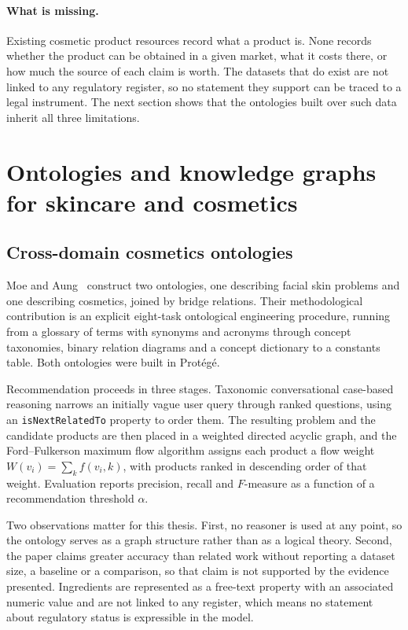 
\paragraph{What is missing.} Existing cosmetic product resources record what a
product is. None records whether the product can be obtained in a given market,
what it costs there, or how much the source of each claim is worth. The datasets
that do exist are not linked to any regulatory register, so no statement they
support can be traced to a legal instrument. The next section shows that the
ontologies built over such data inherit all three limitations.

\section{Ontologies and knowledge graphs for skincare and cosmetics}
\label{sec:rw-ontologies}

\subsection{Cross-domain cosmetics ontologies}
\label{ssec:rw-moe}

Moe and Aung~\cite{moe2014} construct two ontologies, one describing facial
skin problems and one describing cosmetics, joined by bridge relations. Their
methodological contribution is an explicit eight-task ontological engineering
procedure, running from a glossary of terms with synonyms and acronyms through
concept taxonomies, binary relation diagrams and a concept dictionary to a
constants table. Both ontologies were built in Prot\'eg\'e.

Recommendation proceeds in three stages. Taxonomic conversational case-based
reasoning narrows an initially vague user query through ranked questions, using
an \texttt{isNextRelatedTo} property to order them. The resulting problem and
the candidate products are then placed in a weighted directed acyclic graph, and
the Ford--Fulkerson maximum flow algorithm assigns each product a flow weight
$W(v_i)=\sum_k f(v_i,k)$, with products ranked in descending order of that
weight. Evaluation reports precision, recall and $F$-measure as a function of a
recommendation threshold $\alpha$.

Two observations matter for this thesis. First, no reasoner is used at any
point, so the ontology serves as a graph structure rather than as a logical
theory. Second, the paper claims greater accuracy than related work without
reporting a dataset size, a baseline or a comparison, so that claim is not
supported by the evidence presented. Ingredients are represented as a free-text
property with an associated numeric value and are not linked to any register,
which means no statement about regulatory status is expressible in the model.

